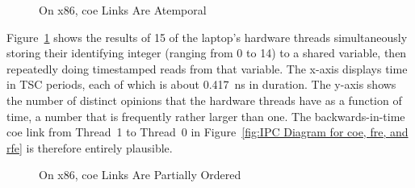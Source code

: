 \documentclass[10]{article}
\begin{document}
\begin{figure}[tb]
\begin{center}
\caption{On x86, coe Links Are Atemporal}
\label{fig:On x86, coe Links Are Atemporal}
\end{center}
\end{figure}

Figure~\ref{fig:On x86, coe Links Are Atemporal}
shows the results of 15 of the laptop's hardware threads simultaneously
storing their identifying integer (ranging from 0 to 14) to a shared
variable, then repeatedly doing timestamped reads from that variable.
The x-axis displays time in TSC periods, each of which is about 0.417~ns
in duration.
The y-axis shows the number of distinct opinions that the hardware
threads have as a function of time, a number that is frequently rather
larger than one.
The backwards-in-time coe link from Thread~1 to Thread~0 in
Figure~\ref{fig:IPC Diagram for coe, fre, and rfe}
is therefore entirely plausible.

\begin{figure}[tb]
\begin{center}
\caption{On x86, coe Links Are Partially Ordered}
\label{fig:On x86, coe Links Are Partially Ordered}
\end{center}
\end{figure}
\end{document}
